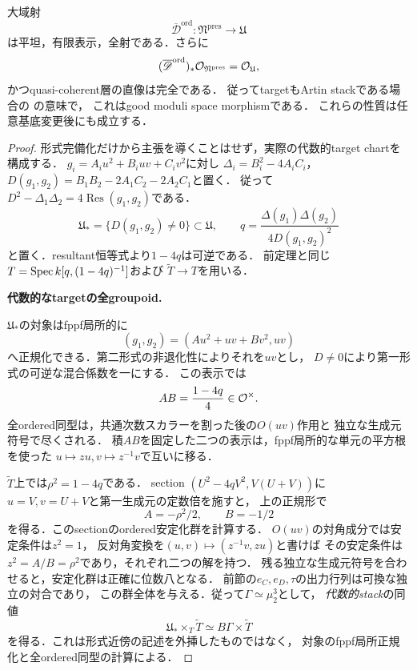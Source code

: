 \begin{proposition}[境界Fricke射の平坦性とcoherent商の性質]
\label{prop:qa-fricke-flat-good-moduli}
大域射
\[
 \overline{\mathscr D}^{\mathrm{ord}}:\mathfrak N^{\mathrm{pres}}
       \longrightarrow\mathfrak U
\]
は平坦，有限表示，全射である．さらに
\[
 (\overline{\mathscr D}^{\mathrm{ord}})_*\mathcal O_{\mathfrak N^{\mathrm{pres}}}
       =\mathcal O_{\mathfrak U},
\]
かつquasi-coherent層の直像は完全である．
従ってtargetもArtin stackである場合の
\cite[Remark~4.4]{AlperGoodModuli2013}の意味で，
これはgood moduli space morphismである．
これらの性質は任意基底変更後にも成立する．
\end{proposition}
\begin{proof}
形式完備化だけから主張を導くことはせず，実際の代数的target chartを構成する．
$g_i=A_i u^2+B_iuv+C_iv^2$に対し
$\Delta_i=B_i^2-4A_iC_i$，
$D(g_1,g_2)=B_1B_2-2A_1C_2-2A_2C_1$と置く．
従って$D^2-\Delta_1\Delta_2=4\operatorname{Res}(g_1,g_2)$である．
\[
 \mathfrak U_*=
 \{D(g_1,g_2)\ne0\}\subset\mathfrak U,
 \qquad q=\frac{\Delta(g_1)\Delta(g_2)}{4D(g_1,g_2)^2}
\]
と置く．resultant恒等式より$1-4q$は可逆である．
前定理と同じ$T=\operatorname{Spec} k[q,(1-4q)^{-1}]$および
$\widetilde T\to T$を用いる．

\par\medskip\noindent\textbf{代数的なtargetの全groupoid.}\par\nobreak\smallskip
$\mathfrak U_*$の対象はfppf局所的に
\[
 (g_1,g_2)=(A u^2+uv+Bv^2,uv)
\]
へ正規化できる．第二形式の非退化性によりそれを$uv$とし，
$D\ne0$により第一形式の可逆な混合係数を一にする．
この表示では
\[
 AB=\frac{1-4q}{4}\in\mathcal O^\times.
\]
全ordered同型は，共通次数スカラーを割った後の$O(uv)$作用と
独立な生成元符号で尽くされる．
積$AB$を固定した二つの表示は，fppf局所的な単元の平方根を使った
$u\mapsto zu,v\mapsto z^{-1}v$で互いに移る．

$\widetilde T$上では$\rho^2=1-4q$である．
section $(U^2-4qV^2,V(U+V))$に
$u=V,v=U+V$と第一生成元の定数倍を施すと，
上の正規形で
\[
 A=-\rho^2/2,\qquad B=-1/2
\]
を得る．このsectionのordered安定化群を計算する．
$O(uv)$の対角成分では安定条件は$z^2=1$，
反対角変換を$(u,v)\mapsto(z^{-1}v,zu)$と書けば
その安定条件は$z^2=A/B=\rho^2$であり，それぞれ二つの解を持つ．
残る独立な生成元符号を合わせると，安定化群は正確に位数八となる．
前節の$e_C,e_D,\tau$の出力行列は可換な独立の対合であり，
この群全体を与える．従って$\Gamma\simeq\mu_2^3$として，
\emph{代数的stack}の同値
\[
 \mathfrak U_*\times_T\widetilde T
       \simeq B\Gamma\times\widetilde T
\]
を得る．これは形式近傍の記述を外挿したものではなく，
対象のfppf局所正規化と全ordered同型の計算による．


\end{proof}

